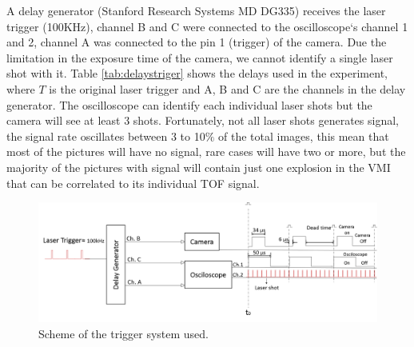 A delay generator (Stanford Research Systems MD DG335) receives the laser trigger (100KHz), channel B and C were connected to the oscilloscope`s channel 1 and 2, channel A was connected to the pin 1 (trigger) of the camera. Due the limitation in the exposure time of the camera, we cannot identify a single laser shot with it. Table \ref{tab:delaystriger} shows the delays used in the experiment, where $T$ is the original laser trigger and A, B and C are the channels in the delay generator. The oscilloscope can identify each individual laser shots but the camera will see at least 3 shots. Fortunately, not all laser shots generates signal, the signal rate oscillates between 3 to 10$\%$ of the total images, this mean that most of the pictures will have no signal, rare cases will have two or more, but the majority of the pictures with signal will contain just one explosion in the VMI that can be correlated to its individual TOF signal. 

\begin{figure}[h!]

\centering
\includegraphics[width = 14 cm]{../Images/Trigger scheme.png}
\caption[Trigger Scheme]{Scheme of the trigger system used.  }
\label{fig:triggers}
\end{figure}

